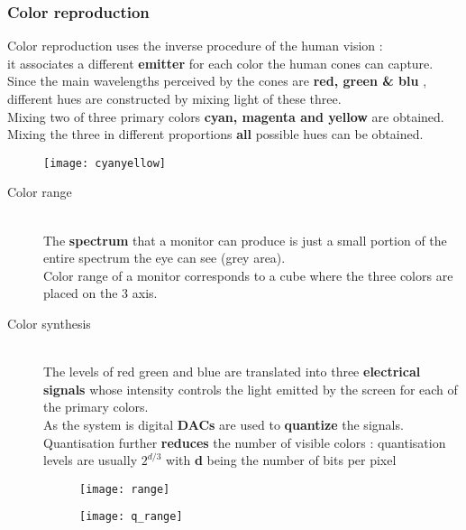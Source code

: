 \subsubsection{Color reproduction}
Color reproduction uses the inverse procedure of the human vision : \\
it associates a different \textbf{emitter} for each color the human cones can capture.
Since the main wavelengths perceived by the cones are \textbf{red, green \& blu} , different hues are constructed by mixing light of these three.\\
Mixing two of three primary colors \textbf{cyan, magenta and yellow} are obtained. Mixing the three in different proportions \textbf{all} possible hues can be obtained.
\begin{figure}[!h]
 \centering
  \texttt{[image: cyanyellow]}
\end{figure}
\begin{description}
\item[Color range]\hfill\\
The \textbf{spectrum} that a monitor can produce is just a small portion of the entire spectrum the eye can see (grey area).\\
Color range of a monitor corresponds to a cube where the three colors are placed on the 3 axis.
\item[Color synthesis]\hfill\\
The levels of red green and blue are translated into three \textbf{electrical signals} whose intensity controls the light emitted by the screen for each of the primary colors.\\ \newpage
As the system is digital \textbf{DACs} are used to \textbf{quantize} the signals.
Quantisation further \textbf{reduces} the number of visible colors : quantisation levels 	are usually $ 2^{d/3}$ with \textbf{d} being the number of bits per pixel

\begin{figure}[!h]
\begin{minipage}{.5\textwidth}
 \centering
  \texttt{[image: range]}
\end{minipage}%
	\begin{minipage}{.5\textwidth}
  \centering
  \texttt{[image: q\_range]}
\end{minipage}%
\end{figure}
\end{description}


